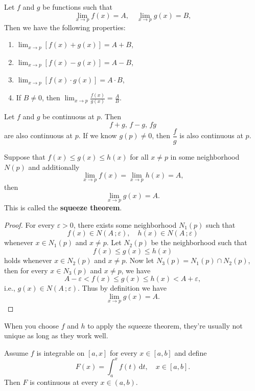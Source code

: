 \documentclass[a4paper]{ctexart}
\begin{document}
	\begin{mythm}
		Let $f$ and $g$ be functions such that 
		\[
		\lim_{x\to p} f(x)=A,\quad \lim_{x\to p} g(x)=B,
		\]
		Then we have the following properties:
		\begin{enumerate}
			\item $\displaystyle \lim_{x\to p} [f(x)+g(x)]=A+B$,
			\item $\displaystyle \lim_{x\to p} [f(x)-g(x)]=A-B$,
			\item $\displaystyle \lim_{x\to p} [f(x)\cdot g(x)]=A\cdot B$,
			\item If $B\neq 0$, then $\displaystyle \lim_{x\to p} \frac{f(x)}{g(x)}=\frac{A}{B}$.
		\end{enumerate}
	\end{mythm}
	\begin{mythm}
		Let $f$ and $g$ be continuous at $p$. Then \[f+g,\, f-g,\, fg \] are also continuous at $p$. If we know $g(p)\neq 0$, then $\dfrac{f}{g}$ is also continuous at $p$.
	\end{mythm}
	\begin{mythm}
		Suppose that $f(x)\le g(x)\le h(x)$ for all $x\neq p$ in some neighborhood $N(p)$ and additionally
		\[
		\lim_{x\to p} f(x)=\lim_{x\to p} h(x)=A,
		\]
		then
		\[
		\lim_{x\to p} g(x)=A.
		\]
		This is called the \textbf{squeeze theorem}.
	\end{mythm}
	\begin{proof}
		For every $\varepsilon>0$, there exists some neighborhood $N_1(p)$ such that
		\[
		f(x)\in N(A\,;\varepsilon),\quad h(x)\in N(A\,;\varepsilon)
		\]
		whenever $x\in N_1(p)$ and $x\neq p$. Let $N_2(p)$ be the neighborhood such that
		\[
		f(x)\le g(x)\le h(x)
		\]
		holds whenever $x\in N_2(p)$ and $x\neq p$. Now let $N_3(p)=N_1(p)\cap N_2(p)$, then for every $x\in N_3(p)$ and $x\neq p$, we have
		\[
		A-\varepsilon < f(x) \le g(x) \le h(x) < A+\varepsilon,
		\]
		i.e., $g(x)\in N(A\,;\varepsilon)$. Thus by definition we have
		\[
		\lim_{x\to p} g(x)=A.
		\]
	\end{proof}
	\begin{myrmk}
		When you choose $f$ and $h$ to apply the squeeze theorem, they're usually not unique as long as they work well.
	\end{myrmk}
	\begin{mythm}
		Assume $f$ is integrable on $[a,x]$ for every $x\in [a,b]$ and define
		\[
		F(x)=\int_a^x f(t)\,\mathrm{d}t,\quad x\in[a,b].
		\]
		Then $F$ is continuous at every $x\in(a,b)$.
	\end{mythm}
\end{document}
